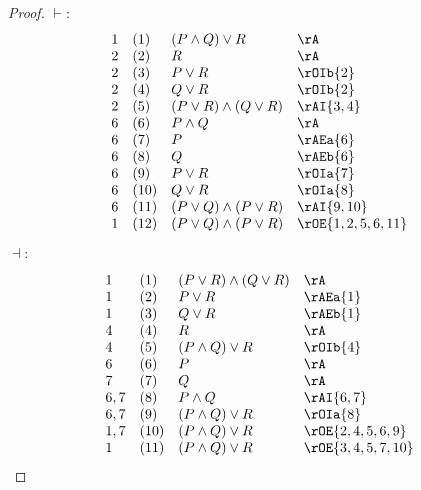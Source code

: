 \documentclass{book}
\theoremstyle{plain}
\theoremstyle{remark}
\theoremstyle{definition}
\begin{document}
\begin{proof}
	\(\vdash:\)
	\[
	\begin{array}{llll}
		1 & (1) & (P \land Q)\lor R & \rA \\
		2 & (2) & R & \rA \\
		2 & (3) & P \lor R & \rOIb{2} \\
		2 & (4) & Q \lor R & \rOIb{2} \\
		2 & (5) & (P \lor R) \land (Q \lor R) & \rAI{3,4} \\
		6 & (6) & P \land Q & \rA \\
		6 & (7) & P & \rAEa{6} \\
		6 & (8) & Q & \rAEb{6} \\
		6 & (9) & P \lor R & \rOIa{7} \\
		6 & (10) & Q \lor R & \rOIa{8} \\
		6 & (11) & (P \lor Q) \land (P \lor R) & \rAI{9,10} \\
		1 & (12) & (P \lor Q) \land (P \lor R) & \rOE{1,2,5,6,11} \\
	\end{array}
	\]
	
	\(\dashv:\)
	
	\[
	\begin{array}{llll}
		1 & (1) & (P \lor R) \land (Q \lor R) & \rA \\
		1 & (2) & P \lor R & \rAEa{1} \\
		1 & (3) & Q \lor R & \rAEb{1} \\
		4 & (4) & R & \rA \\
		4 & (5) & (P \land Q)\lor R & \rOIb{4} \\
		6 & (6) & P & \rA \\
		7 & (7) & Q & \rA \\
		6,7 & (8) & P \land Q & \rAI{6,7} \\
		6,7 & (9) & (P \land Q)\lor R & \rOIa{8} \\
		1,7 & (10) & (P \land Q)\lor R & \rOE{2,4,5,6,9} \\
		1 & (11) & (P \land Q)\lor R & \rOE{3,4,5,7,10} \\
	\end{array}
	\]
\end{proof}
\end{document}
